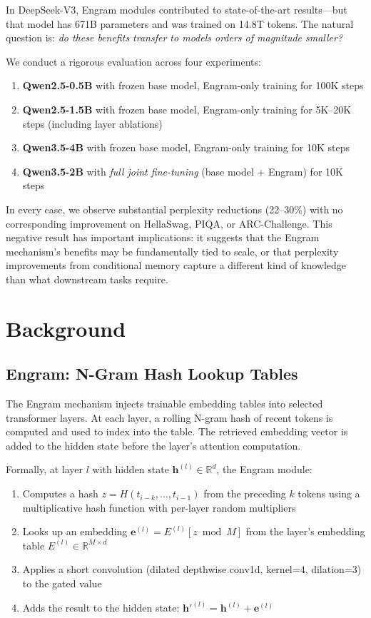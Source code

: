 \documentclass{article}
\begin{document}
In DeepSeek-V3, Engram modules contributed to state-of-the-art results---but that model has 671B parameters and was trained on 14.8T tokens. The natural question is: \emph{do these benefits transfer to models orders of magnitude smaller?}

We conduct a rigorous evaluation across four experiments:
\begin{enumerate}[nosep]
    \item \textbf{Qwen2.5-0.5B} with frozen base model, Engram-only training for 100K steps
    \item \textbf{Qwen2.5-1.5B} with frozen base model, Engram-only training for 5K--20K steps (including layer ablations)
    \item \textbf{Qwen3.5-4B} with frozen base model, Engram-only training for 10K steps
    \item \textbf{Qwen3.5-2B} with \emph{full joint fine-tuning} (base model + Engram) for 10K steps
\end{enumerate}

In every case, we observe substantial perplexity reductions (22--30\%) with no corresponding improvement on HellaSwag, PIQA, or ARC-Challenge. This negative result has important implications: it suggests that the Engram mechanism's benefits may be fundamentally tied to scale, or that perplexity improvements from conditional memory capture a different kind of knowledge than what downstream tasks require.

\section{Background}

\subsection{Engram: N-Gram Hash Lookup Tables}

The Engram mechanism injects trainable embedding tables into selected transformer layers. At each layer, a rolling N-gram hash of recent tokens is computed and used to index into the table. The retrieved embedding vector is added to the hidden state before the layer's attention computation.

Formally, at layer $l$ with hidden state $\mathbf{h}^{(l)} \in \mathbb{R}^d$, the Engram module:
\begin{enumerate}[nosep]
    \item Computes a hash $z = H(t_{i-k}, \ldots, t_{i-1})$ from the preceding $k$ tokens using a multiplicative hash function with per-layer random multipliers
    \item Looks up an embedding $\mathbf{e}^{(l)} = E^{(l)}[z \bmod M]$ from the layer's embedding table $E^{(l)} \in \mathbb{R}^{M \times d}$
    \item Applies a short convolution (dilated depthwise conv1d, kernel=4, dilation=3) to the gated value
    \item Adds the result to the hidden state: $\mathbf{h}'^{(l)} = \mathbf{h}^{(l)} + \mathbf{e}^{(l)}$
\end{enumerate}
\end{document}
